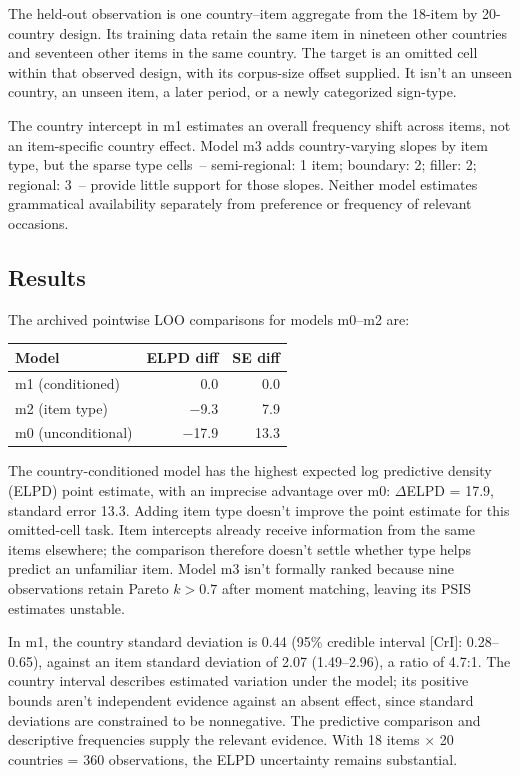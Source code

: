 \documentclass[12pt]{article}
\begin{document}
The held-out observation is one country--item aggregate from the 18-item
by 20-country design. Its training data retain the same item in nineteen
other countries and seventeen other items in the same country. The target
is an omitted cell within that observed design, with its corpus-size
offset supplied. It isn't an unseen country, an unseen item, a later
period, or a newly categorized sign-type.

The country intercept in m1 estimates an overall frequency shift across items, not an item-specific country effect. Model m3 adds country-varying slopes by item type, but the sparse type cells~-- semi-regional: 1 item; boundary: 2; filler: 2; regional: 3~-- provide little support for those slopes. Neither model estimates grammatical availability separately from preference or frequency of relevant occasions.

\subsection{Results}

The archived pointwise LOO comparisons for models m0--m2 are:

\begin{center}
\begin{tabular}{lrr}
  \hline
  Model & ELPD diff & SE diff \\
  \hline
  m1 (conditioned) & 0.0 & 0.0 \\
  m2 (item type) & $-$9.3 & 7.9 \\
  m0 (unconditional) & $-$17.9 & 13.3 \\
  \hline
\end{tabular}
\end{center}

The country-conditioned model has the highest expected log predictive density (ELPD) point estimate, with an imprecise advantage over m0: $\Delta$ELPD = 17.9, standard error 13.3. Adding item type doesn't improve the point estimate for this omitted-cell task. Item intercepts already receive information from the same items elsewhere; the comparison therefore doesn't settle whether type helps predict an unfamiliar item. Model m3 isn't formally ranked because nine observations retain Pareto $k > 0.7$ after moment matching, leaving its PSIS estimates unstable.

In m1, the country standard deviation is 0.44 (95\% credible interval [CrI]: 0.28--0.65), against an item standard deviation of 2.07 (1.49--2.96), a ratio of 4.7:1. The country interval describes estimated variation under the model; its positive bounds aren't independent evidence against an absent effect, since standard deviations are constrained to be nonnegative. The predictive comparison and descriptive frequencies supply the relevant evidence. With 18 items $\times$ 20 countries = 360 observations, the ELPD uncertainty remains substantial.
\end{document}
